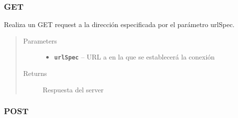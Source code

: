 \documentclass[letterpaper,10pt,english]{sphinxmanual}
\begin{document}
\subsubsection{GET}
\label{Singletons/ServerHandler:id1}

\begin{fulllineitems}
\label{Singletons/ServerHandler:com.fiuba.tallerii.jobify.ServerHandler.GET(String)}
Realiza un GET request a la dirección especificada por el parámetro urlSpec.
\begin{quote}\begin{description}
\item[{Parameters}] \leavevmode\begin{itemize}
\item {} 
\textbf{\texttt{urlSpec}} -- URL a en la que se establecerá la conexión

\end{itemize}

\item[{Returns}] \leavevmode
Respuesta del server

\end{description}\end{quote}

\end{fulllineitems}



\subsubsection{POST}
\label{Singletons/ServerHandler:post}
\end{document}
